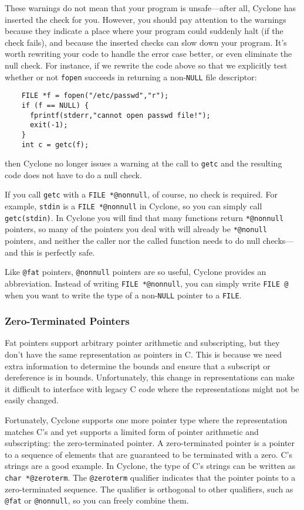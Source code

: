 These warnings do not mean that your program is unsafe---after all,
Cyclone has inserted the check for you.  However, you should pay
attention to the warnings because they indicate a place where your
program could suddenly halt (if the check fails), and because the
inserted checks can slow down your program.  It's worth rewriting your
code to handle the error case better, or even eliminate the null
check.  For instance, if we rewrite the code above so that we
explicitly test whether or not \texttt{fopen} succeeds in returning a
non-\texttt{NULL} file descriptor:
\begin{verbatim}
    FILE *f = fopen("/etc/passwd","r");
    if (f == NULL) {
      fprintf(stderr,"cannot open passwd file!");
      exit(-1);
    }
    int c = getc(f);
\end{verbatim}
then Cyclone no longer issues a warning at the call to \texttt{getc}
and the resulting code does not have to do a null check.

If you call \texttt{getc} with a \texttt{FILE *@nonnull}, of course, no check
is required.  For example, \texttt{stdin} is a \texttt{FILE *@nonnull} in
Cyclone, so you can simply call \texttt{getc(stdin)}.  In Cyclone you
will find that many functions return \texttt{*@nonnull} pointers, so many of
the pointers you deal with will already be \texttt{*@nonull} pointers, and
neither the caller nor the called function needs to do null
checks---and this is perfectly safe.

Like \texttt{@fat} pointers, \texttt{@nonnull} pointers are so useful,
Cyclone provides an abbreviation.  Instead of writing \texttt{FILE
*@nonnull}, you can simply write \texttt{FILE @} when you want to
write the type of a non-\texttt{NULL} pointer to a \texttt{FILE}.

\subsubsection*{Zero-Terminated Pointers}

Fat pointers support arbitrary pointer arithmetic and subscripting,
but they don't have the same representation as pointers in C.  This
is because we need extra information to determine the bounds and
ensure that a subscript or dereference is in bounds.  Unfortunately,
this change in representations can make it difficult to interface
with legacy C code where the representations might not be easily
changed.  

Fortunately, Cyclone supports one more pointer type where the
representation matches C's and yet supports a limited form of pointer
arithmetic and subscripting: the zero-terminated pointer.  A
zero-terminated pointer is a pointer to a sequence of elements that
are guaranteed to be terminated with a zero.  C's strings are a good
example.  In Cyclone, the type of C's strings can be written as
\texttt{char *@zeroterm}.  The \texttt{@zeroterm} qualifier indicates
that the pointer points to a zero-terminated sequence.  The qualifier
is orthogonal to other qualifiers, such as \texttt{@fat} or
\texttt{@nonnull}, so you can freely combine them.

